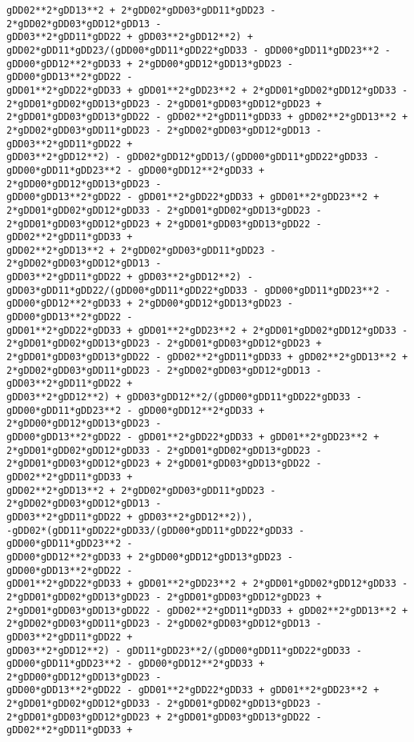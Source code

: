 \documentclass[landscape,letterpaper,10pt,english]{article}
\begin{document}
\begin{Verbatim}[commandchars=\\\{\}]
gDD02**2*gDD13**2 + 2*gDD02*gDD03*gDD11*gDD23 - 2*gDD02*gDD03*gDD12*gDD13 -
gDD03**2*gDD11*gDD22 + gDD03**2*gDD12**2) +
gDD02*gDD11*gDD23/(gDD00*gDD11*gDD22*gDD33 - gDD00*gDD11*gDD23**2 -
gDD00*gDD12**2*gDD33 + 2*gDD00*gDD12*gDD13*gDD23 - gDD00*gDD13**2*gDD22 -
gDD01**2*gDD22*gDD33 + gDD01**2*gDD23**2 + 2*gDD01*gDD02*gDD12*gDD33 -
2*gDD01*gDD02*gDD13*gDD23 - 2*gDD01*gDD03*gDD12*gDD23 +
2*gDD01*gDD03*gDD13*gDD22 - gDD02**2*gDD11*gDD33 + gDD02**2*gDD13**2 +
2*gDD02*gDD03*gDD11*gDD23 - 2*gDD02*gDD03*gDD12*gDD13 - gDD03**2*gDD11*gDD22 +
gDD03**2*gDD12**2) - gDD02*gDD12*gDD13/(gDD00*gDD11*gDD22*gDD33 -
gDD00*gDD11*gDD23**2 - gDD00*gDD12**2*gDD33 + 2*gDD00*gDD12*gDD13*gDD23 -
gDD00*gDD13**2*gDD22 - gDD01**2*gDD22*gDD33 + gDD01**2*gDD23**2 +
2*gDD01*gDD02*gDD12*gDD33 - 2*gDD01*gDD02*gDD13*gDD23 -
2*gDD01*gDD03*gDD12*gDD23 + 2*gDD01*gDD03*gDD13*gDD22 - gDD02**2*gDD11*gDD33 +
gDD02**2*gDD13**2 + 2*gDD02*gDD03*gDD11*gDD23 - 2*gDD02*gDD03*gDD12*gDD13 -
gDD03**2*gDD11*gDD22 + gDD03**2*gDD12**2) -
gDD03*gDD11*gDD22/(gDD00*gDD11*gDD22*gDD33 - gDD00*gDD11*gDD23**2 -
gDD00*gDD12**2*gDD33 + 2*gDD00*gDD12*gDD13*gDD23 - gDD00*gDD13**2*gDD22 -
gDD01**2*gDD22*gDD33 + gDD01**2*gDD23**2 + 2*gDD01*gDD02*gDD12*gDD33 -
2*gDD01*gDD02*gDD13*gDD23 - 2*gDD01*gDD03*gDD12*gDD23 +
2*gDD01*gDD03*gDD13*gDD22 - gDD02**2*gDD11*gDD33 + gDD02**2*gDD13**2 +
2*gDD02*gDD03*gDD11*gDD23 - 2*gDD02*gDD03*gDD12*gDD13 - gDD03**2*gDD11*gDD22 +
gDD03**2*gDD12**2) + gDD03*gDD12**2/(gDD00*gDD11*gDD22*gDD33 -
gDD00*gDD11*gDD23**2 - gDD00*gDD12**2*gDD33 + 2*gDD00*gDD12*gDD13*gDD23 -
gDD00*gDD13**2*gDD22 - gDD01**2*gDD22*gDD33 + gDD01**2*gDD23**2 +
2*gDD01*gDD02*gDD12*gDD33 - 2*gDD01*gDD02*gDD13*gDD23 -
2*gDD01*gDD03*gDD12*gDD23 + 2*gDD01*gDD03*gDD13*gDD22 - gDD02**2*gDD11*gDD33 +
gDD02**2*gDD13**2 + 2*gDD02*gDD03*gDD11*gDD23 - 2*gDD02*gDD03*gDD12*gDD13 -
gDD03**2*gDD11*gDD22 + gDD03**2*gDD12**2)),
-gDD02*(gDD11*gDD22*gDD33/(gDD00*gDD11*gDD22*gDD33 - gDD00*gDD11*gDD23**2 -
gDD00*gDD12**2*gDD33 + 2*gDD00*gDD12*gDD13*gDD23 - gDD00*gDD13**2*gDD22 -
gDD01**2*gDD22*gDD33 + gDD01**2*gDD23**2 + 2*gDD01*gDD02*gDD12*gDD33 -
2*gDD01*gDD02*gDD13*gDD23 - 2*gDD01*gDD03*gDD12*gDD23 +
2*gDD01*gDD03*gDD13*gDD22 - gDD02**2*gDD11*gDD33 + gDD02**2*gDD13**2 +
2*gDD02*gDD03*gDD11*gDD23 - 2*gDD02*gDD03*gDD12*gDD13 - gDD03**2*gDD11*gDD22 +
gDD03**2*gDD12**2) - gDD11*gDD23**2/(gDD00*gDD11*gDD22*gDD33 -
gDD00*gDD11*gDD23**2 - gDD00*gDD12**2*gDD33 + 2*gDD00*gDD12*gDD13*gDD23 -
gDD00*gDD13**2*gDD22 - gDD01**2*gDD22*gDD33 + gDD01**2*gDD23**2 +
2*gDD01*gDD02*gDD12*gDD33 - 2*gDD01*gDD02*gDD13*gDD23 -
2*gDD01*gDD03*gDD12*gDD23 + 2*gDD01*gDD03*gDD13*gDD22 - gDD02**2*gDD11*gDD33 +

\end{Verbatim}
\end{document}
